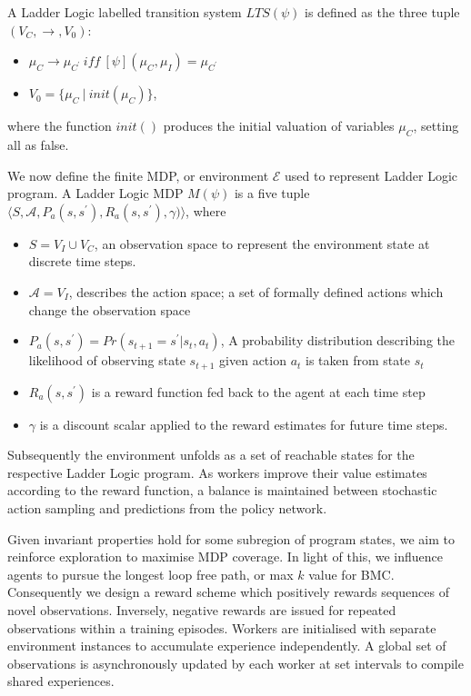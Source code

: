\documentclass[runningheads]{llncs}
\begin{document}
A Ladder Logic labelled transition system $LTS(\psi)$ is defined as the three tuple $(V_C, \to, V_0)$:
\begin{itemize}
	\item $\mu_C \to \mu_{C^\prime} \ \textit{iff} \ [\psi](\mu_C,\mu_I)=\mu_{C^\prime}$
	\item $V_0 = \{\mu_C \ | \ init(\mu_C)\}$,
\end{itemize}where the function $init()$ produces the initial valuation of variables $\mu_C$, setting all as false.

We now define the finite MDP, or environment $\mathcal{E}$ used to represent Ladder Logic program. A Ladder Logic MDP $M(\psi)$ is a five tuple $\langle S,\mathcal{A},P_a(s,s^\prime), R_a(s,s^\prime),\gamma) \rangle$, where 
\begin{itemize}
	\item $S = V_I \cup V_C$, an observation space to represent the environment state at discrete time steps.
	\item $\mathcal{A} = V_I$, describes the action space; a set of formally defined actions which change the observation space
	\item $P_a(s,s^\prime) = Pr(s_{t+1} = s^\prime | s_t, a_t)$, A probability distribution describing the likelihood of observing state $s_{t+1}$ given action $a_t$ is taken from state $s_t$
	\item $R_a(s,s^\prime)$ is a reward function fed back to the agent at each time step
	\item $\gamma$ is a discount scalar applied to the reward estimates for future time steps.
\end{itemize}

Subsequently the environment unfolds as a set of reachable states for the respective Ladder Logic program. As workers improve their value estimates according to the reward function, a balance is maintained between stochastic action sampling and predictions from the policy network.

Given invariant properties hold for some subregion of program states, we aim to reinforce exploration to maximise MDP coverage. In light of this, we influence agents to pursue the longest loop free path, or max $k$ value for BMC. Consequently we design a reward scheme which positively rewards sequences of novel observations. Inversely, negative rewards are issued for repeated observations within a training episodes. Workers are initialised with separate environment instances to accumulate experience independently. A global set of observations is asynchronously updated by each worker at set intervals to compile shared experiences.    
\end{document}
